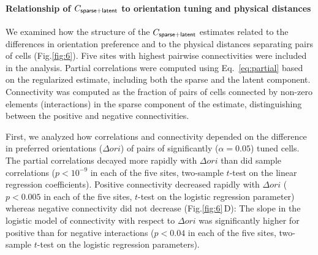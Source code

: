 \documentclass[10pt]{article}
\newcommand{\figref}[2]{Fig.\;\ref{fig:#1}\,#2}
\begin{document}
\paragraph{Relationship of $C_{\sf sparse+latent}$ to orientation tuning and physical distances}

We examined how the structure of the $C_{\sf sparse+latent}$ estimates related to the differences in orientation preference and to the physical distances separating pairs of cells (Fig.\;\ref{fig:6}).  Five sites with highest pairwise connectivities were included in the analysis. Partial correlations were computed using Eq.~\ref{eq:partial} based on the regularized estimate, including both the sparse and the latent component. Connectivity was computed as the fraction of pairs of cells connected by non-zero elements (interactions) in the sparse component of the estimate, distinguishing between the positive and negative connectivities. 

First, we analyzed how correlations and connectivity depended on the difference in preferred orientations ($\Delta ori$) of pairs of significantly ($\alpha=0.05$) tuned cells. The partial correlations decayed more rapidly with $\Delta ori$ than did sample correlations ($p<10^{-9}$ in each of the five sites, two-sample $t$-test on the linear regression coefficients). Positive connectivity decreased rapidly with $\Delta ori$ ($p<0.005$ in each of the five sites, $t$-test on the logistic regression parameter) whereas negative connectivity did not decrease (\figref{6}{D}): The slope in the logistic model of connectivity with respect to $\Delta ori$ was significantly higher for positive than for negative interactions ($p<0.04$ in each of the five sites, two-sample $t$-test on the logistic regression parameters). 
\end{document}
